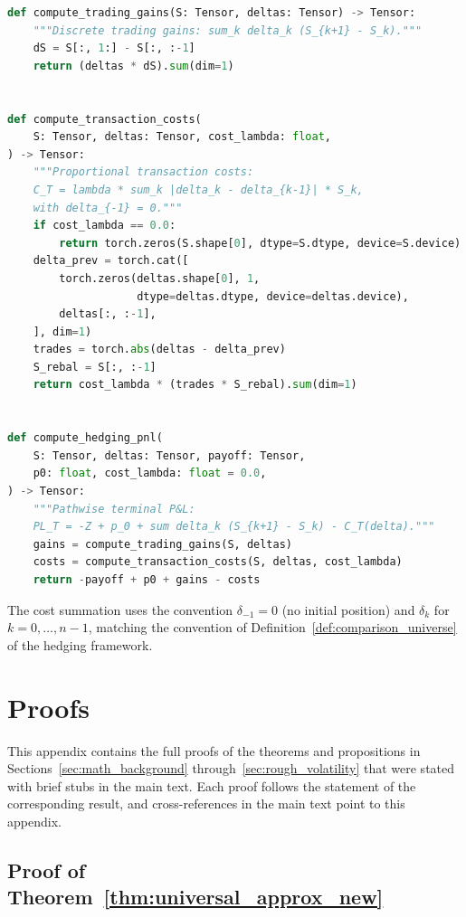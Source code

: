 \documentclass[12pt,a4paper]{article}
\theoremstyle{definition}
\theoremstyle{plain}
\theoremstyle{remark}
\theoremstyle{plain}
\begin{document}
\begin{lstlisting}[language=Python, caption={Terminal P\&L computation}, label={lst:pnl_code}]
def compute_trading_gains(S: Tensor, deltas: Tensor) -> Tensor:
    """Discrete trading gains: sum_k delta_k (S_{k+1} - S_k)."""
    dS = S[:, 1:] - S[:, :-1]
    return (deltas * dS).sum(dim=1)


def compute_transaction_costs(
    S: Tensor, deltas: Tensor, cost_lambda: float,
) -> Tensor:
    """Proportional transaction costs:
    C_T = lambda * sum_k |delta_k - delta_{k-1}| * S_k,
    with delta_{-1} = 0."""
    if cost_lambda == 0.0:
        return torch.zeros(S.shape[0], dtype=S.dtype, device=S.device)
    delta_prev = torch.cat([
        torch.zeros(deltas.shape[0], 1,
                    dtype=deltas.dtype, device=deltas.device),
        deltas[:, :-1],
    ], dim=1)
    trades = torch.abs(deltas - delta_prev)
    S_rebal = S[:, :-1]
    return cost_lambda * (trades * S_rebal).sum(dim=1)


def compute_hedging_pnl(
    S: Tensor, deltas: Tensor, payoff: Tensor,
    p0: float, cost_lambda: float = 0.0,
) -> Tensor:
    """Pathwise terminal P&L:
    PL_T = -Z + p_0 + sum delta_k (S_{k+1} - S_k) - C_T(delta)."""
    gains = compute_trading_gains(S, deltas)
    costs = compute_transaction_costs(S, deltas, cost_lambda)
    return -payoff + p0 + gains - costs
\end{lstlisting}

The cost summation uses the convention $\delta_{-1} = 0$ (no initial
position) and $\delta_k$ for $k = 0, \dots, n-1$, matching the
convention of Definition~\ref{def:comparison_universe} of the hedging
framework.

\section{Proofs}
\label{app:proofs}

This appendix contains the full proofs of the theorems and propositions
in Sections~\ref{sec:math_background} through~\ref{sec:rough_volatility}
that were stated with brief stubs in the main text. Each proof follows
the statement of the corresponding result, and cross-references in the
main text point to this appendix.

\subsection{Proof of Theorem~\ref{thm:universal_approx_new}}
\label{proof:universal_approx}
\end{document}
